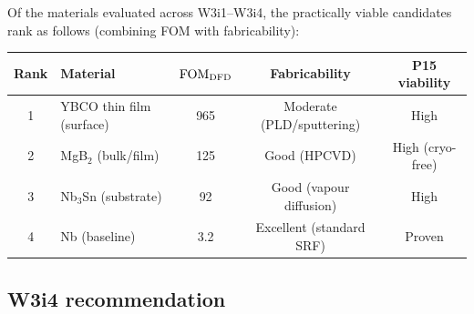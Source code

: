 \documentclass[11pt]{article}
\newcommand{\FOM}{\mathrm{FOM}}
\begin{document}
Of the materials evaluated across W3i1--W3i4, the practically viable candidates
rank as follows (combining FOM with fabricability):

\begin{center}
\begin{tabular}{clccc}
\toprule
Rank & Material & $\FOM_{\rm DFD}$ & Fabricability & P15 viability \\
\midrule
1 & YBCO thin film (surface) & 965 & Moderate (PLD/sputtering) & High \\
2 & MgB$_2$ (bulk/film) & 125 & Good (HPCVD) & High (cryo-free) \\
3 & Nb$_3$Sn (substrate) & 92 & Good (vapour diffusion) & High \\
4 & Nb (baseline) & 3.2 & Excellent (standard SRF) & Proven \\
\bottomrule
\end{tabular}
\end{center}

\subsection{W3i4 recommendation}
\end{document}
